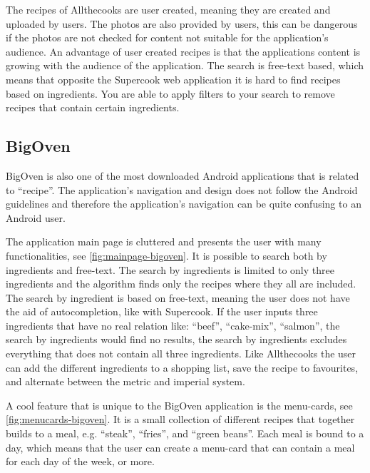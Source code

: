 The recipes of Allthecooks are user created, meaning they are created and uploaded by users. The photos are also provided by users, this can be dangerous if the photos are not checked for content not suitable for the application's audience. An advantage of user created recipes is that the applications content is growing with the audience of the application.
The search is free-text based, which means that opposite the Supercook web application it is hard to find recipes based on ingredients. You are able to apply filters to your search to remove recipes that contain certain ingredients.

\subsection{BigOven}
BigOven is also one of the most downloaded \cite{bigoven-googleplay} Android applications that is related to ``recipe''. The application's navigation and design does not follow the Android guidelines\cite{guidelines-appstructure} and therefore the application's navigation can be quite confusing to an Android user.

The application main page is cluttered and presents the user with many functionalities, see \autoref{fig:mainpage-bigoven}. It is possible to search both by ingredients and free-text. The search by ingredients is limited to only three ingredients and the algorithm finds only the recipes where they all are included. The search by ingredient is based on free-text, meaning the user does not have the aid of autocompletion, like with Supercook. If the user inputs three ingredients that have no real relation like: ``beef'', ``cake-mix'', ``salmon'', the search by ingredients would find no results, the search by ingredients excludes everything that does not contain all three ingredients. Like Allthecooks the user can add the different ingredients to a shopping list, save the recipe to favourites, and alternate between the metric and imperial system.

A cool feature that is unique to the BigOven application is the menu-cards, see \autoref{fig:menucards-bigoven}.
It is a small collection of different recipes that together builds to a meal, e.g. ``steak'', ``fries'', and ``green beans''. Each meal is bound to a day, which means that the user can create a menu-card that can contain a meal for each day of the week, or more. 

